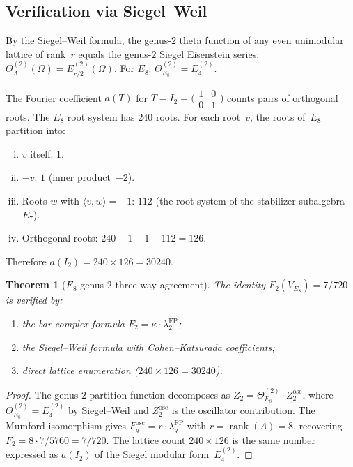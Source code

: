 \documentclass[11pt,reqno]{amsart}
\newtheorem{theorem}{Theorem}[section]
\theoremstyle{definition}
\theoremstyle{remark}
\numberwithin{equation}{section}
\begin{document}
\subsection{Verification via Siegel--Weil}

By the Siegel--Weil formula, the genus-$2$ theta function of
any even unimodular lattice of rank~$r$ equals the genus-$2$
Siegel Eisenstein series:
$\Theta_\Lambda^{(2)}(\Omega) = E_{r/2}^{(2)}(\Omega)$.
For $E_8$: $\Theta_{E_8}^{(2)} = E_4^{(2)}$.

The Fourier coefficient $a(T)$ for
$T = I_2 = \bigl(\begin{smallmatrix} 1 & 0 \\
0 & 1 \end{smallmatrix}\bigr)$ counts pairs of orthogonal
roots. The $E_8$ root system has $240$ roots. For each
root~$v$, the roots of~$E_8$ partition into:
\begin{enumerate}[(i)]
\item $v$ itself: $1$.
\item $-v$: $1$ (inner product~$-2$).
\item Roots $w$ with $\langle v, w \rangle = \pm 1$: $112$
 (the root system of the stabilizer subalgebra~$E_7$).
\item Orthogonal roots: $240 - 1 - 1 - 112 = 126$.
\end{enumerate}
Therefore $a(I_2) = 240 \times 126 = 30240$.

\begin{theorem}[$E_8$ genus-$2$ three-way agreement]
\label{thm:e8-three-way}
The identity $F_2(V_{E_8}) = 7/720$ is verified by:
\begin{enumerate}
\item the bar-complex formula
 $F_2 = \kappa \cdot \lambda_2^{\mathrm{FP}}$;
\item the Siegel--Weil formula with Cohen--Katsurada
 coefficients;
\item direct lattice enumeration \textup{(}$240 \times 126
 = 30240$\textup{)}.
\end{enumerate}
\end{theorem}

\begin{proof}
The genus-$2$ partition function decomposes as
$Z_2 = \Theta_{E_8}^{(2)} \cdot Z_2^{\mathrm{osc}}$, where
$\Theta_{E_8}^{(2)} = E_4^{(2)}$ by Siegel--Weil and
$Z_2^{\mathrm{osc}}$ is the oscillator contribution.
The Mumford isomorphism gives
$F_g^{\mathrm{osc}} = r \cdot \lambda_g^{\mathrm{FP}}$ with
$r = \operatorname{rank}(\Lambda) = 8$, recovering
$F_2 = 8 \cdot 7/5760 = 7/720$. The lattice count
$240 \times 126$ is the same number expressed as
$a(I_2)$ of the Siegel modular form~$E_4^{(2)}$.
\end{proof}
\end{document}
